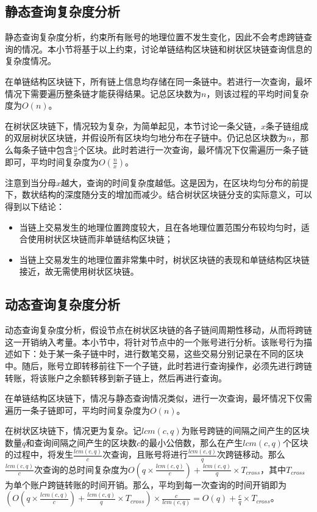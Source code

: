 \subsection{静态查询复杂度分析}

静态查询复杂度分析，约束所有账号的地理位置不发生变化，因此不会考虑跨链查询的情况。本小节将基于以上约束，讨论单链结构区块链和树状区块链查询信息的复杂度情况。

在单链结构区块链下，所有链上信息均存储在同一条链中。若进行一次查询，最坏情况下需要遍历整条链才能获得结果。记总区块数为$n$，则该过程的平均时间复杂度为$O(n)$。

在树状区块链下，情况较为复杂，为简单起见，本节讨论一条父链，$x$条子链组成的双层树状区块链，并假设所有区块均匀地分布在子链中。仍记总区块数为$n$，那么每条子链中包含$\frac{n}{x}$个区块。此时若进行一次查询，最坏情况下仅需遍历一条子链即可，平均时间复杂度为$O(\frac{n}{x})$。

注意到当分母$x$越大，查询的时间复杂度越低。这是因为，在区块均匀分布的前提下，数状结构的深度随分支的增加而减少。结合树状区块链分支的实际意义，可以得到以下结论：

\begin{itemize}
    \item 当链上交易发生的地理位置跨度较大，且在各地理位置范围分布较均匀时，适合使用树状区块链而非单链结构区块链；
    \item 当链上交易发生的地理位置非常集中时，树状区块链的表现和单链结构区块链接近，故无需使用树状区块链。
\end{itemize}

\subsection{动态查询复杂度分析}

动态查询复杂度分析，假设节点在树状区块链的各子链间周期性移动，从而将跨链这一开销纳入考量。本小节中，将针对节点中的一个账号进行分析。该账号行为描述如下：处于某一条子链中时，进行数笔交易，这些交易分别记录在不同的区块中。随后，账号立即转移前往下一个子链，此时若进行查询操作，必须先进行跨链转账，将该账户之余额转移到新子链上，然后再进行查询。

在单链结构区块链下，情况与静态查询情况类似，进行一次查询，最坏情况下仅需遍历一条子链即可，平均时间复杂度为$O(n)$。

在树状区块链下，情况更为复杂。记$lcm(c, q)$为账号跨链的间隔之间产生的区块数量$q$和查询间隔之间产生的区块数$c$的最小公倍数，那么在产生$lcm(c, q)$个区块的过程中，将发生$\frac{lcm(c, q)}{c}$次查询，且账号将进行$\frac{lcm(c, q)}{q}$次跨链移动。那么$\frac{lcm(c, q)}{c}$次查询的总时间复杂度为$O(q \times \frac{lcm(c, q)}{c}) + \frac{lcm(c, q)}{q} \times T_{cross}$，其中$T_{cross}$为单个账户跨链转账的时间开销。那么，平均到每一次查询的时间开销即为$(O(q \times \frac{lcm(c, q)}{c}) + \frac{lcm(c, q)}{q} \times T_{cross}) \times \frac{c}{lcm(c, q)} = O(q) + \frac{c}{q} \times T_{cross}$。

